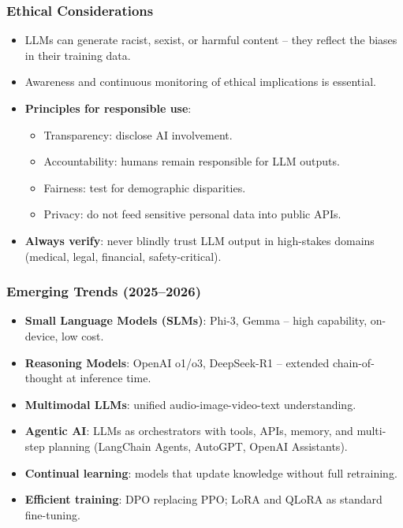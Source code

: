 \begin{frame}[fragile]\frametitle{Ethical Considerations}
\begin{itemize}
\item LLMs can generate racist, sexist, or harmful content – they reflect the biases in their training data.
\item Awareness and continuous monitoring of ethical implications is essential.
\item \textbf{Principles for responsible use}:
  \begin{itemize}
  \item Transparency: disclose AI involvement.
  \item Accountability: humans remain responsible for LLM outputs.
  \item Fairness: test for demographic disparities.
  \item Privacy: do not feed sensitive personal data into public APIs.
  \end{itemize}
\item \textbf{Always verify}: never blindly trust LLM output in high-stakes domains (medical, legal, financial, safety-critical).
\end{itemize}
\end{frame}

\begin{frame}[fragile]\frametitle{Emerging Trends (2025--2026)}
\begin{itemize}
\item \textbf{Small Language Models (SLMs)}: Phi-3, Gemma – high capability, on-device, low cost.
\item \textbf{Reasoning Models}: OpenAI o1/o3, DeepSeek-R1 – extended chain-of-thought at inference time.
\item \textbf{Multimodal LLMs}: unified audio-image-video-text understanding.
\item \textbf{Agentic AI}: LLMs as orchestrators with tools, APIs, memory, and multi-step planning (LangChain Agents, AutoGPT, OpenAI Assistants).
\item \textbf{Continual learning}: models that update knowledge without full retraining.
\item \textbf{Efficient training}: DPO replacing PPO; LoRA and QLoRA as standard fine-tuning.
\end{itemize}
\end{frame}


